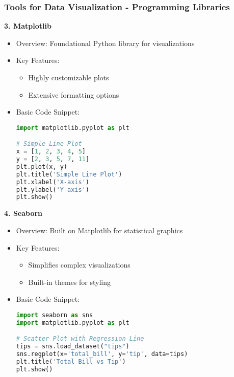 \documentclass[aspectratio=169]{beamer}
\begin{document}
\begin{frame}[fragile]
    \frametitle{Tools for Data Visualization - Programming Libraries}
    \textbf{3. Matplotlib}
    \begin{itemize}
        \item Overview: Foundational Python library for visualizations
        \item Key Features:
            \begin{itemize}
                \item Highly customizable plots
                \item Extensive formatting options
            \end{itemize}
        \item Basic Code Snippet:
        \begin{lstlisting}[language=Python]
import matplotlib.pyplot as plt

# Simple Line Plot
x = [1, 2, 3, 4, 5]
y = [2, 3, 5, 7, 11]
plt.plot(x, y)
plt.title('Simple Line Plot')
plt.xlabel('X-axis')
plt.ylabel('Y-axis')
plt.show()
        \end{lstlisting}
    \end{itemize}

    \textbf{4. Seaborn}
    \begin{itemize}
        \item Overview: Built on Matplotlib for statistical graphics
        \item Key Features:
            \begin{itemize}
                \item Simplifies complex visualizations
                \item Built-in themes for styling
            \end{itemize}
        \item Basic Code Snippet:
        \begin{lstlisting}[language=Python]
import seaborn as sns
import matplotlib.pyplot as plt

# Scatter Plot with Regression Line
tips = sns.load_dataset("tips")
sns.regplot(x='total_bill', y='tip', data=tips)
plt.title('Total Bill vs Tip')
plt.show()
        \end{lstlisting}
    \end{itemize}
\end{frame}
\end{document}
